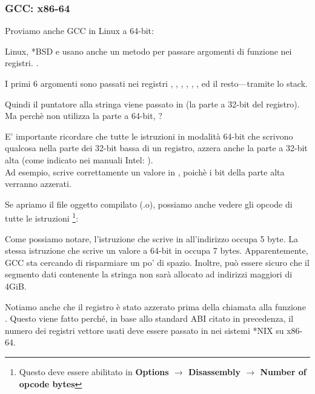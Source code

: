 \subsubsection{GCC: x86-64}

Proviamo anche GCC in Linux a 64-bit:



Linux, *BSD e \MacOSX usano anche un metodo per passare argomenti di funzione nei registri. \SysVABI.

I primi 6 argomenti sono passati nei registri \RDI, \RSI, \RDX, \RCX, , , ed il resto---tramite lo stack.

Quindi il puntatore alla stringa viene passato in \EDI (la parte a 32-bit del registro).
Ma perchè non utilizza la parte a 64-bit, \RDI?

E' importante ricordare che tutte le istruzioni \MOV in modalità 64-bit che scrivono qualcosa nella parte dei 32-bit bassa di un registro, azzera anche la parte a 32-bit alta (come indicato nei manuali Intel: ).\\
Ad esempio,  scrive correttamente un valore in \RAX, poichè i bit della parte alta verranno azzerati.

Se apriamo il file oggetto compilato (.o), possiamo anche vedere gli opcode di tutte le istruzioni
\footnote{Questo deve essere abilitato in \textbf{Options $\rightarrow$ Disassembly $\rightarrow$ Number of opcode bytes}}:



\label{hw_EDI_instead_of_RDI}
Come possiamo notare, l'istruzione che scrive in \EDI all'indirizzo  occupa 5 byte.
La stessa istruzione che scrive un valore a 64-bit in \RDI occupa 7 bytes.
Apparentemente, GCC sta cercando di risparmiare un po' di spazio.
Inoltre, può essere sicuro che il segmento dati contenente la stringa non sarà allocato ad indirizzi maggiori di 4\gls{GiB}.

\label{SysVABI_input_EAX}
Notiamo anche che il registro \EAX è stato azzerato prima della chiamata alla funzione \printf.
Questo viene fatto perché, in base allo standard \ac{ABI} citato in precedenza,
il numero dei registri vettore usati deve essere passato in \EAX nei sistemi *NIX su x86-64.
